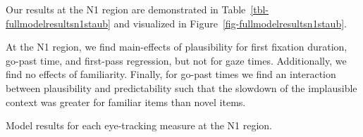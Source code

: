 \documentclass[
  12pt,
  letterpaper,
]{scrreport}
\begin{document}
Our results at the N1 region are demonstrated in
Table~\ref{tbl-fullmodelresultsn1staub} and visualized in
Figure~\ref{fig-fullmodelresultsn1staub}.

At the N1 region, we find main-effects of plausibility for first
fixation duration, go-past time, and first-pass regression, but not for
gaze times. Additionally, we find no effects of familiarity. Finally,
for go-past times we find an interaction between plausibility and
predictability such that the slowdown of the implausible context was
greater for familiar items than novel items.

\begin{table}

\caption{\label{tbl-fullmodelresultsn1staub}Model results for each
eye-tracking measure at the N1 region.}

\centering{

\centering\begingroup\fontsize{12}{14}\selectfont

}
\end{table}
\end{document}
